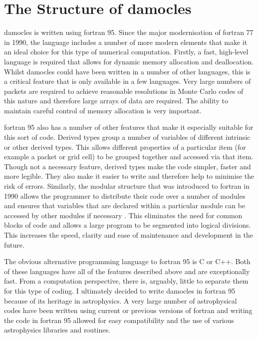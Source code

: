         \section{The Structure of {\sc damocles}}
        \label{damocles_struct}
        
        {\sc damocles} is written using {\sc fortran} 95.  Since the major modernisation of {\sc fortran} 77 in 1990, the language includes a number of more modern elements that make it an ideal choice for this type of numerical computation.  Firstly, a fast, high-level language is required that allows for dynamic memory allocation and deallocation.  Whilst {\sc damocles} could have been written in a number of other languages, this is a critical feature that is only available in a few languages.  Very large numbers of packets are required to achieve reasonable resolutions in Monte Carlo codes of this nature and therefore  large arrays of data are required.  The ability to maintain careful control of memory allocation is very important.  
        
        {\sc fortran} 95 also has a number of other features that make it especially suitable for this sort of code.  Derived types group a number of variables of different intrinsic or other derived types.  This allows different properties of a particular item (for example a packet or grid cell) to be grouped together and accessed via that item. Though not a necessary feature, derived types make the code simpler, faster and more legible.  They also make it easier to write and therefore help to minimise the risk of errors.  Similarly, the modular structure that was introduced to {\sc fortran} in 1990 allows the programmer to distribute their code over a number of modules and ensures that variables that are declared within a particular module can be accessed by other modules if necessary \citep{Ellis1994}.  This eliminates the need for common blocks of code and allows a large program to be segmented into logical divisions.  This increases the speed, clarity and ease of maintenance and development in the future.
        
        The obvious alternative programming language to {\sc fortran} 95 is C or C++.  Both of these languages have all of the features described above and are exceptionally fast.  From a computation perspective, there is, arguably, little to separate them for this type of coding.  I ultimately decided to write {\sc damocles} in {\sc fortran} 95 because of its heritage in astrophysics.  A very large number of astrophysical codes have been written using current or previous versions of {\sc fortran} and writing the code in {\sc fortran} 95 allowed for easy compatibility and the use of various astrophysics libraries and routines.
        
